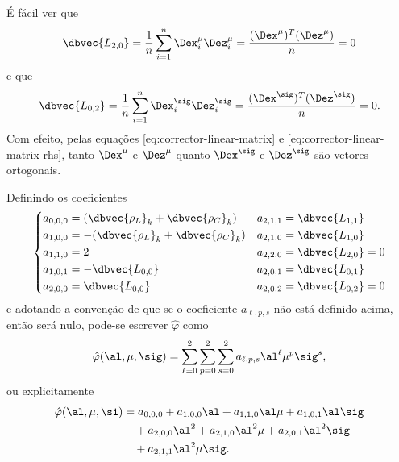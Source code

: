 \begin{obs}
É fácil ver que   \[\dbvec{L_{2,0}} = \frac{1}{n} \sum_{i=1}^n
\Dex_i^\mu\Dez_i^\mu = \frac{(\Dex^\mu)^T(\Dez^\mu)}{n} = 0\] e que  
  \[\dbvec{L_{0,2}} = \frac{1}{n} \sum_{i=1}^n
\Dex_i^\sig\Dez_i^\sig = \frac{(\Dex^\sig)^T(\Dez^\sig)}{n} = 0.\] 
Com efeito, pelas equações \eqref{eq:corrector-linear-matrix} e \eqref{eq:corrector-linear-matrix-rhs},
 tanto $\Dex^\mu$ e $\Dez^\mu$ quanto $\Dex^\sig$ e $\Dez^\sig$ são vetores ortogonais. 


\end{obs}


Definindo os coeficientes \[ \left\{
\begin{aligned}
a_{0,0,0} &= (\dbvec{\rho_L}_k + \dbvec{\rho_C}_k)     & a_{2,1,1} &=
\dbvec{L_{1,1}}\\
a_{1,0,0} &= - (\dbvec{\rho_L}_k + \dbvec{\rho_C}_k)   & a_{2,1,0} &=
\dbvec{L_{1,0}}\\
a_{1,1,0} &= 2 				    & a_{2,2,0} &= \dbvec{L_{2,0}}=0\\
a_{1,0,1} &= -  \dbvec{L_{0,0}} & a_{2,0,1} &= \dbvec{L_{0,1}}\\
a_{2,0,0} &=  \dbvec{L_{0,0}} & a_{2,0,2} &= \dbvec{L_{0,2}}=0\\
\end{aligned}\right.	
\]
e adotando a convenção de que se o coeficiente  $a_{\ell,p,s}$ não está definido
acima, então será nulo, pode-se escrever $\hat{\varphi}$ como
\[
\hat{\varphi}(\al,\mu,\sig) = \sum_{\ell= 0}^2\sum_{p=0}^2 
\sum_{s=0}^2a_{\ell,p,s}\al^\ell\mu^p\sig^s,
\]   
ou explicitamente
\begin{equation}
\begin{aligned}
\hat{\varphi}(\al,\mu,\si) & = 	a_{0,0,0} + a_{1,0,0}\al + a_{1,1,0}\al\mu + 
a_{1,0,1}\al\sig  
\\
&\quad + a_{2,0,0}\al^2
 + a_{2,1,0}\al^2\mu   + a_{2,0,1}\al^2\sig\\ 
& \quad + a_{2,1,1}\al^2\mu\sig.
\end{aligned}
\label{eq:varphi-poly-form}
\end{equation}

